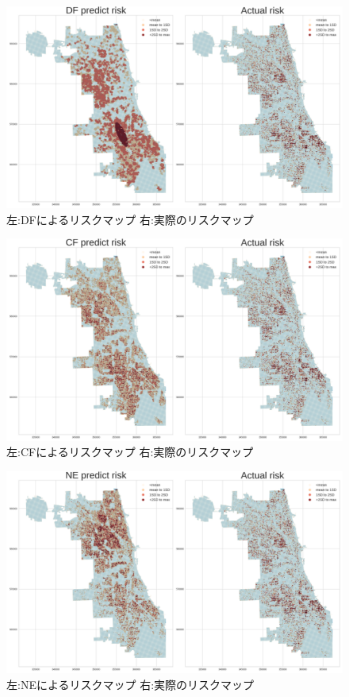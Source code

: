 \begin{figure}
  \centering %
  \includegraphics[scale=0.25]{./non-crime-no-timeseries-fig/DF_riskmap.png}
  \caption{左:DFによるリスクマップ 右:実際のリスクマップ}
  \label{fig:non-crime-no-timeseries-df-risk}
\end{figure}

\begin{figure}
  \centering %
  \includegraphics[scale=0.25]{./non-crime-no-timeseries-fig/CF_riskmap.png}
  \caption{左:CFによるリスクマップ 右:実際のリスクマップ}
  \label{fig:non-crime-no-timeseries-cf-risk}
\end{figure}

\begin{figure}
  \centering %
  \includegraphics[scale=0.25]{./non-crime-no-timeseries-fig/NE_riskmap.png}
  \caption{左:NEによるリスクマップ 右:実際のリスクマップ}
  \label{fig:non-crime-no-timeseries-ne-risk}
\end{figure}


